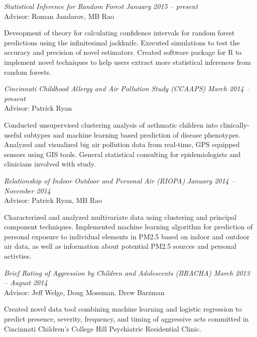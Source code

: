 \documentclass[margin,line]{res}
\newenvironment{list1}{
  \begin{list}{\ding{113}}{%
      \setlength{\itemsep}{0in}
      \setlength{\parsep}{0in} \setlength{\parskip}{0in}
      \setlength{\topsep}{0in} \setlength{\partopsep}{0in} 
      \setlength{\leftmargin}{0.17in}}}{\end{list}}
\begin{document}
\begin{resume}
\vspace{-0.2in}

\textsl{Statistical Inference for Random Forest}
\hfill \textit{January 2015 -- present} \\
Advisor: Roman Jandarov, MB Rao \\
\vspace{-0.13in}
\begin{list1}
\item[]Deveopment of theory for calculating confidence intervals for random forest predictions using the infinitesimal jackknife.  Executed simulations to test the accuracy and precision of novel estimators.  Created software package for R to implement novel techniques to help users extract more statistical inferences from random forests.
\end{list1}


\textsl{Cincinnati Childhood Allergy and Air Pollution Study (CCAAPS)}
\hfill \textit{March 2014 -- present} \\
Advisor: Patrick Ryan \\
\vspace{-0.13in}
\begin{list1}
\item[]Conducted unsupervised clustering analysis of asthmatic children into clinically-useful subtypes and machine learning based prediction of disease phenotypes. Analyzed and visualized big air pollution data from real-time, GPS equipped sensors using GIS tools. General statistical consulting for epidemiologists and clinicians involved with study. 
\end{list1}


\textsl{Relationship of Indoor Outdoor and Personal Air  (RIOPA)}
\hfill \textit{January 2014 -- November 2014} \\
Advisor: Patrick Ryan, MB Rao \\
\vspace{-0.13in}
\begin{list1}
\item[] Characterized and analyzed multivariate data using clustering and principal component techniques. Implemented machine learning algorithm for prediction of personal exposure to individual elements in PM2.5 based on indoor and outdoor air data, as well as information about potential PM2.5 sources and personal activties.
\end{list1}



\textsl{Brief Rating of Aggression by Children and Adolescents (BRACHA)}
\hfill \textit{March 2013 -- August 2014} \\
Advisor: Jeff Welge, Doug Mossman, Drew Barzman \\
\vspace{-0.13in}
\begin{list1}
\item[] Created novel data tool combining machine learning and logistic regression to predict presence, severity, frequency, and timing of aggressive acts committed in Cincinnati Children's College Hill Psychiatric Residential Clinic.
\end{list1}


\end{resume}
\end{document}
